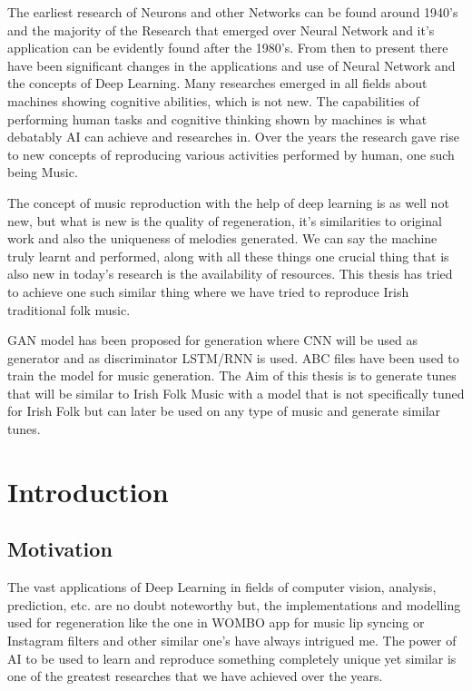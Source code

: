 \documentclass[oneside,12pt]{Classes/RoboticsLaTeX}
\begin{document}
\begin{abstracts}

The earliest research of Neurons and other Networks can be found around 1940's and the majority of the Research that emerged over Neural Network and it's application can be evidently found after the 1980's. From then to present there have been significant changes in the applications and use of Neural Network and the concepts of Deep Learning. Many researches emerged in all fields about machines showing cognitive abilities, which is not new. The capabilities of performing human tasks and cognitive thinking  shown by machines is what debatably AI can achieve and researches in. Over the years the research gave rise to new concepts of reproducing various activities performed by human, one such being Music.

The concept of music reproduction with the help of deep learning is as well not new, but what is new is the quality of regeneration, it's similarities to original work and also the uniqueness of melodies generated. We can say the machine truly learnt and performed, along with all these things one crucial thing that is also new in today's research is the availability of resources. This thesis has tried to achieve one such similar thing where we have tried to reproduce Irish traditional folk music.

GAN model has been proposed for generation where CNN will be used as generator and as discriminator LSTM/RNN is used. ABC files have been used to train the model for music generation. The Aim of this thesis is to generate tunes that will be similar to Irish Folk Music with a model that is not specifically tuned for Irish Folk but can later be used on any type of music and generate similar tunes.

\end{abstracts}


\tableofcontents
\listoffigures
\printglossary[title=List of Acronyms,type=\acronymtype]

\mainmatter

\chapter{Introduction}
\label{chap:introduction}
\section{Motivation}

The vast applications of Deep Learning in fields of computer vision, analysis, prediction, etc. are no doubt noteworthy but, the implementations and modelling used for regeneration like the one in WOMBO app for music lip syncing or Instagram filters and other similar one's have always intrigued me. The power of AI to be used to learn and reproduce something completely unique yet similar is one of the greatest researches that we have achieved over the years.
\end{document}
